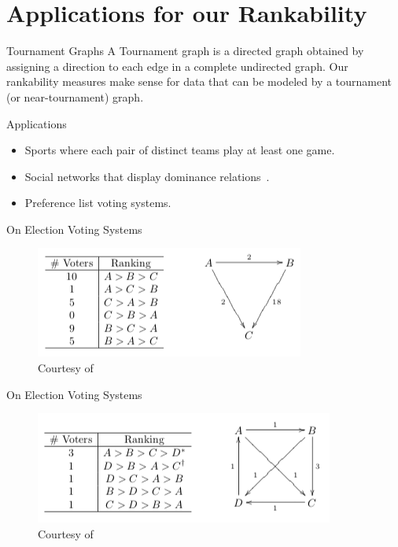 \documentclass{beamer}
\begin{document}
\section{Applications for our Rankability}

\begin{frame}{Tournament Graphs}
A Tournament graph is a directed graph obtained by assigning a direction to each edge in a complete undirected graph.
\vfill
Our rankability measures make sense for data that can be modeled by a tournament (or near-tournament) graph.
\end{frame}

\begin{frame}{Applications}
\begin{itemize}
\item	Sports where each pair of distinct teams play at least one game.
\vfill
\item	Social networks that display dominance relations~\cite{Landau1953}.
\vfill
\item	Preference list voting systems.
\end{itemize}
\end{frame}

\begin{frame}{On Election Voting Systems}
\begin{figure}[H]
\centering
\includegraphics[width=\textwidth]{figures/dodgson-fig1.png}
\caption{Courtesy of~\cite{Ratliff2010}}
\end{figure}
\end{frame}

\begin{frame}{On Election Voting Systems}
\begin{figure}[H]
\centering
\includegraphics[width=\textwidth]{figures/dodgson-fig2.png}
\caption{Courtesy of~\cite{Ratliff2010}}
\end{figure}
\end{frame}
\end{document}
